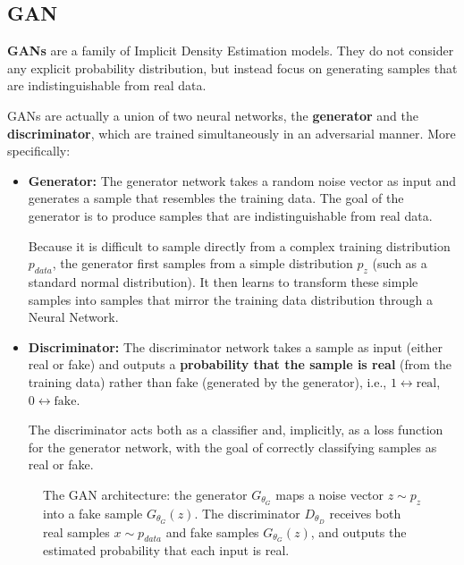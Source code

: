 \subsection{GAN}
\textbf{GANs} are a family of Implicit Density Estimation models. They do not consider any explicit probability distribution, but instead focus on generating samples that are indistinguishable from real data.

GANs are actually a union of two neural networks, the \textbf{generator} and the \textbf{discriminator}, which are trained simultaneously in an adversarial manner.
More specifically:

\begin{itemize}
    \item \textbf{Generator:} The generator network takes a random noise vector as input and generates a sample that resembles the training data. 
    The goal of the generator is to produce samples that are indistinguishable from real data. 
    
    Because it is difficult to sample directly from a complex training distribution $p_{data}$, 
    the generator first samples from a simple distribution $p_{z}$ (such as a standard normal distribution). 
    It then learns to transform these simple samples into samples that mirror the training data distribution through a Neural Network.
    
    \item \textbf{Discriminator:} The discriminator network takes a sample as input (either real or fake) and outputs a \textbf{probability that the sample is real} 
    (from the training data) rather than fake (generated by the generator), i.e., $1 \leftrightarrow \text{real}$, $0 \leftrightarrow \text{fake}$.
    
    The discriminator acts both as a classifier and, implicitly, as a loss function for the generator network, with the goal of correctly classifying samples as real or fake.
\end{itemize}

\begin{figure}[H]
    \centering
    \resizebox{0.85\textwidth}{!}{}
    \caption{The GAN architecture: the generator $G_{\theta_G}$ maps a noise vector $z \sim p_z$ into a fake sample $G_{\theta_G}(z)$. The discriminator $D_{\theta_D}$ receives both real samples $x \sim p_{data}$ and fake samples $G_{\theta_G}(z)$, and outputs the estimated probability that each input is real.}
    \label{fig:gan-architecture}
\end{figure}

